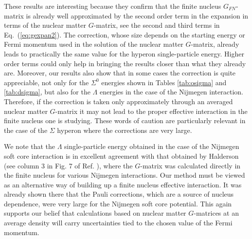 These results  are interesting because they confirm that
the finite nucleus $G_{FN}$-matrix is already well 
approximated by the second order term 
in the expansion in terms of the nuclear matter $G$-matrix, see
the second and third terms in Eq.\ (\ref{eq:gexpan2}).
The correction, whose size depends on the starting energy or Fermi
momentum used in the solution of the nuclear matter $G$-matrix, already
leads to practically the same value for the hyperon single-particle energy.
Higher order terms could only help in bringing the results closer than
what they already are.
Moreover, our results also show that in some cases the correction is
quite
appreciable, not only for the $\Sigma^0$ energies shown in
Tables \ref{tab:osigma} and \ref{tab:dsigma}, but also for the
$\Lambda$ energies in
the case of the Nijmegen interaction. Therefore, if the correction is
taken only approximately through an averaged nuclear matter $G$-matrix 
it may not lead to the proper
effective interaction in the finite nucleus one is studying. These
words of caution are particularly relevant in the case of the $\Sigma$
hyperon where the corrections are very large.


We note that the $\Lambda$ single-particle energy obtained in the case of the
Nijmegen soft core interaction is in excellent agreement with that
obtained by Halderson (see column 3 in Fig. 7 of Ref.
\cite{hald93}), where the $G$-matrix
was calculated directly in the finite nucleus for various Nijmegen
interactions. 
Our method must be viewed as an alternative
way of building up a finite nucleus
effective interaction. 
It was already
shown there that the Pauli corrections, which are a source of nucleus
dependence, were very large for the Nijmegen soft core potential. This
again supports our belief that calculations based on nuclear matter
$G$-matrices at an average density will carry uncertainties tied to
the chosen value of the Fermi momentum. 

